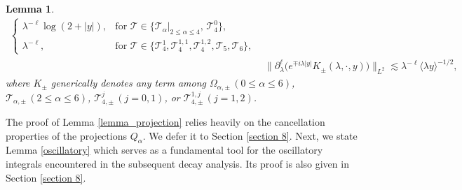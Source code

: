 \documentclass[reqno]{amsart}
\newtheorem{lemma}[theorem]{Lemma}
\numberwithin{equation}{section}
\begin{document}
\begin{lemma}
\begin{align}
\begin{cases}
		\lambda^{-\ell}\log(2+|y|), & \text{for } \mathcal{T} \in \{\mathcal{T}_\alpha|_{2\le\alpha\le4}, \, \mathcal{T}_4^0\}, \\[2pt]
		\lambda^{-\ell}, & \text{for } \mathcal{T} \in \{\mathcal{T}_4^{1}, \mathcal{T}_4^{1,1}, \mathcal{T}_4^{1,2}, \mathcal{T}_5, \mathcal{T}_6\},
		\end{cases} \label{lemma_projection_T} \\   &\|\partial_\lambda^\ell\big(e^{\mp i\lambda|y|}K_{\pm}(\lambda,\cdot,y)\big)\|_{L^2} \lesssim\lambda^{-\ell}\langle\lambda y\rangle^{-1/2}, \label{lemma_projection_1}
	\end{align}
	where $K_{\pm}$ generically denotes any  term among $\Omega_{\alpha,\pm} \, (0\le\alpha\le6)$, $\mathcal{T}_{\alpha,\pm} \, (2\le\alpha\le6)$, $\mathcal{T}_{4,\pm}^j \, (j=0,1)$, or $\mathcal{T}_{4,\pm}^{1,j} \, (j=1,2)$.
\end{lemma}

The proof of Lemma \ref{lemma_projection} relies heavily on the cancellation properties of the projections $Q_{\alpha}$. We defer it to Section \ref{section 8}.
Next, we state Lemma \ref{oscillatory} which  serves as a fundamental tool for the oscillatory integrals encountered in the subsequent decay analysis. Its proof is also given in Section \ref{section 8}.
\end{document}
